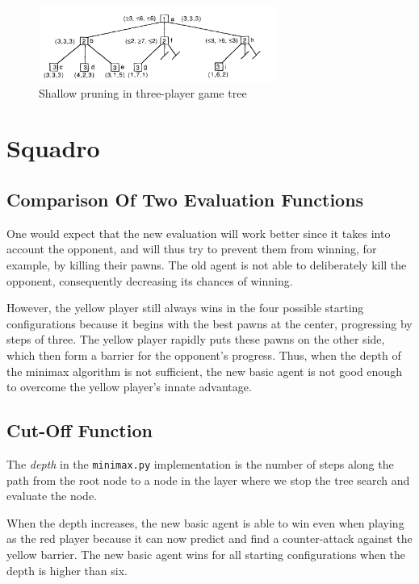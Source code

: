 \documentclass[journal,onecolumn]{IEEEtran}
\newcommand{\py}[1]{\texttt{#1}}
\begin{document}
\begin{figure}[H]
 \centering
 \includegraphics[width=0.7\textwidth]{img/multiplayer.png}
 \caption{Shallow pruning in three-player game tree \cite{multiplayer}}
 \label{fig:multiplayer}
\end{figure}


\section{Squadro}

\subsection{Comparison Of Two Evaluation Functions}
One would expect that the new evaluation will work better since it takes into account the opponent, and will thus try to prevent them from winning, for example, by killing their pawns.
The old agent is not able to deliberately kill the opponent, consequently decreasing its chances of winning.

However, the yellow player still always wins in the four possible starting configurations because it begins with the best pawns at the center, progressing by steps of three.
The yellow player rapidly puts these pawns on the other side, which then form a barrier for the opponent's progress.
Thus, when the depth of the minimax algorithm is not sufficient, the new basic agent is not good enough to overcome the yellow player's innate advantage.

\subsection{Cut-Off Function}
The \emph{depth} in the \py{minimax.py} implementation is the number of steps along the path from the root node to a node in the layer where we stop the tree search and evaluate the node.

When the depth increases, the new basic agent is able to win even when playing as the red player because it can now predict and find a counter-attack against the yellow barrier.
The new basic agent wins for all starting configurations when the depth is higher than six.
\end{document}

